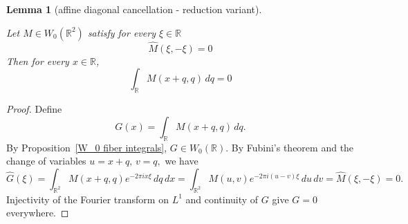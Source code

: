 \documentclass[12pt,reqno]{amsart}
\theoremstyle{plain}
\newtheorem{lemma}[theorem]{Lemma}
\numberwithin{equation}{section}
\theoremstyle{remark}
\newcommand{\uses}[1]{}
\newcommand{\usesdefs}[1]{}
\newcommand{\leanok}{}
\newcommand{\lean}[1]{}
\begin{document}
\begin{lemma}[affine diagonal cancellation - reduction variant]
\label{lem:affine-diagonal-cancellation-reduction}\uses{W_0 fiber integrals}\usesdefs{auto:Wiener-space-definition}
\lean{Auto.affineDiagonalCancellationReduction}
\leanok
Let \(M\in W_0(\mathbb R^2)\) satisfy for every \(\xi\in\mathbb R\)
\begin{equation}\label{auto:affine-diagonal-cancellation-assumption}
\widehat M(\xi,-\xi)=0
\end{equation}
 Then for every \(x\in\mathbb R\),
\begin{equation}
    \label{E:affine-diagonal-cancellation}
    \int_{\mathbb R}M(x+q,q)\,dq=0
\end{equation}
\end{lemma}

\begin{proof}
    Define
\[
G(x)=\int_{\mathbb R}M(x+q,q)\,dq.
\]
By Proposition~\ref{W_0 fiber integrals}, \(G\in W_0(\mathbb R)\).
By Fubini's theorem and the change of variables
$ u=x+q, \, v=q, $
we have
\[
\widehat G(\xi)
=
\int_{\mathbb R^2}
M(x+q,q)e^{-2\pi ix\xi}\,dq\,dx
=
\int_{\mathbb R^2}
M(u,v)e^{-2\pi i(u-v)\xi}\,du\,dv=
\widehat M(\xi,-\xi)
=
0.
\]
Injectivity of the Fourier transform on \(L^1\) and continuity of $G$ give
\(G=0\) everywhere.
\end{proof}
\end{document}
